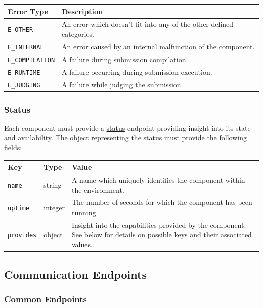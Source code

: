 \documentclass[11pt,letterpaper]{article}
\begin{document}
\begin{tabulary}{\textwidth}{ | l | L | }
    \hline
    \textbf{Error Type} & \textbf{Description} \\
    \hline
    \texttt{E\_OTHER} & An error which doesn't fit into any of the other defined
        categories. \\
    \hline
    \texttt{E\_INTERNAL} & An error caused by an internal malfunction of the
        component. \\
    \hline
    \texttt{E\_COMPILATION} & A failure during submission compilation. \\
    \hline
    \texttt{E\_RUNTIME} & A failure occurring during submission execution. \\
    \hline
    \texttt{E\_JUDGING} & A failure while judging the submission. \\
    \hline
\end{tabulary}

\subsubsection{Status}
\label{comm-formats-status}

Each component must provide a \hyperref[comm-endpoints-common]{status} endpoint
providing insight into its state and availability. The object representing the
status must provide the following fields:

\begin{tabulary}{\textwidth}{ | l | l | L | }
    \hline
    \textbf{Key} & \textbf{Type} & \textbf{Value} \\
    \hline
    \texttt{name} & string & A name which uniquely identifies the component
        within the environment. \\
    \hline
    \texttt{uptime} & integer & The number of seconds for which the component
        has been running. \\
    \hline
    \texttt{provides} & object & Insight into the capabilities provided by the
        component. See below for details on possible keys and their associated
        values. \\
    \hline
\end{tabulary}

\subsection{Communication Endpoints}
\label{comm-endpoints}

\subsubsection{Common Endpoints}
\label{comm-endpoints-common}
\end{document}
